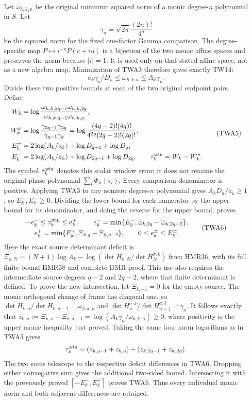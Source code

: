 \documentclass[11pt,a4paper]{article}
\begin{document}
Let $\omega_{h,k,n}$ be the original minimum squared norm of a monic
degree-$n$ polynomial in $S$. Let
\[
\gamma_n=\sqrt{2\pi}\frac{(2n)!}{4^n}
\]
be the squared norm for the fixed one-factor Gamma comparison.
The degree-specific map $P\mapsto i^{-n}P(c+iu)$ is a bijection of
the two monic affine spaces and preserves the norm because $|i|=1$.
It is used only on that stated affine space, not as a new algebra map.
Minimization of TWA3 therefore gives exactly TW14:
\[
a_k\gamma_n/D_n\le\omega_{h,k,n}\le A_k\gamma_n.
\]
Divide these two positive bounds at each of the two original
endpoint pairs. Define
\[
\begin{aligned}
W_k&=\log\frac{\omega_{h,k,2q-1}\omega_{h,k,2q}}
{\omega_{h,k,q-1}\omega_{h,k,q}},\\
W_k^\sigma&=\log\frac{\gamma_{2q-1}\gamma_{2q}}
{\gamma_{q-1}\gamma_q}
 =\log\frac{(4q-2)!(4q)!}{4^{2q}(2q-2)!(2q)!},\\
E_k^+&=2\log(A_k/a_k)+\log D_{q-1}+\log D_q,\\
E_k^-&=2\log(A_k/a_k)+\log D_{2q-1}+\log D_{2q},\qquad
\tau_k^{\rm win}=W_k-W_k^\sigma.
\end{aligned}\tag{TWA5}
\]
The symbol $\tau_k^{\rm win}$ denotes this scalar window error;
it does not rename the original phase polynomial $\sum_i\Phi_h(s_i)$.
Every comparison denominator is positive. Applying TWA3 to any
nonzero degree-$n$ polynomial gives $A_kD_n/a_k\ge1$, so
$E_k^+,E_k^-\ge0$. Dividing the lower bound for each numerator by
the upper bound for its denominator, and doing the reverse for the
upper bound, proves
\[
\begin{gathered}
 -e_k^-\le\tau_k^{\rm win}\le e_k^+,\qquad
 e_k^-=\min\{E_k^-,\Xi_{k,2q}-\Xi_{k,2q-2}\},\\
 e_k^+=\min\{E_k^+,\Xi_{k,q}-\Xi_{k,q-2}\},
 \qquad 0\leq e_k^\pm\leq E_k^\pm .
\end{gathered}\tag{TWA6}
\]
Here the exact source determinant deficit is
$\Xi_{k,N}=(N+1)\log A_k-
\log(\det H_{k,N}/\det H_N^{\sigma,k})$ from HMR36,
with its full finite bound HMR38 and complete DMR proof.
This use also requires the intermediate source degrees
$q-2$ and $2q-2$, where that finite determinant is defined.
To prove the new intersection, let $\Xi_{k,-1}=0$ for
the empty source. The monic orthogonal change of frame has
diagonal one, so
$\det H_{k,n}/\det H_{k,n-1}=\omega_{h,k,n}$
and
$\det H_n^{\sigma,k}/\det H_{n-1}^{\sigma,k}=\gamma_n$.
It follows exactly that
$z_{k,n}:=\Xi_{k,n}-\Xi_{k,n-1}
=\log(A_k\gamma_n/\omega_{h,k,n})\geq0$,
where positivity is the upper monic inequality just proved.
Taking the same four norm logarithms as in TWA5 gives
\[
 \tau_k^{\rm win}
 =(z_{k,q-1}+z_{k,q})-(z_{k,2q-1}+z_{k,2q}).
\]
The two sums telescope to the respective deficit differences
in TWA6. Dropping either nonnegative sum gives the additional
two-sided bound. Intersecting it with the previously proved
$[-E_k^-,E_k^+]$ proves TWA6. Thus every individual monic
norm and both adjacent differences are retained.
\end{document}
